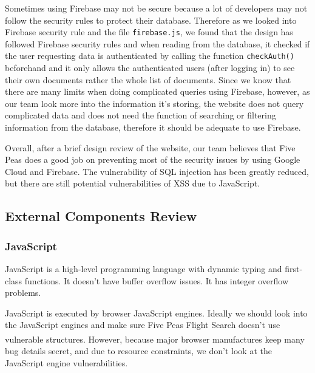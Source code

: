 \documentclass[12pt, a4paper]{article}
\newcommand{\code}[1]{\texttt{#1}}
\begin{document}
Sometimes using Firebase may not be secure because a lot of developers may not follow the security rules to protect their database. Therefore as we looked into Firebase security rule \cite{firebase} and the file \code{firebase.js}, we found that the design has followed Firebase security rules and when reading from the database, it checked if the user requesting data is authenticated by calling the function \code{checkAuth()} beforehand and it only allows the authenticated users (after logging in) to see their own documents rather the whole list of documents. Since we know that there are many limits when doing complicated queries using Firebase, however, as our team look more into the information it’s storing, the website does not query complicated data and does not need the function of searching or filtering information from the database, therefore it should be adequate to use Firebase.

Overall, after a brief design review of the website, our team believes that Five Peas does a good job on preventing most of the security issues by using Google Cloud and Firebase. The vulnerability of SQL injection has been greatly reduced, but there are still potential vulnerabilities of XSS due to JavaScript.


\subsection{External Components Review}
\label{dependency-evaluation}










\subsubsection{JavaScript}
JavaScript is a high-level programming language with dynamic typing and first-class functions. It doesn't have buffer overflow issues. It has integer overflow problems.

JavaScript is executed by browser JavaScript engines. Ideally we should look into the JavaScript engines and make sure Five Peas Flight Search doesn't use vulnerable structures. However, because major browser manufactures\textsuperscript{\cite{chrome-update}} keep many bug details secret, and due to resource constraints, we don't look at the JavaScript engine vulnerabilities.
\end{document}
